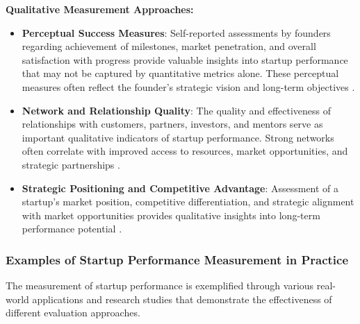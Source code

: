 \documentclass[../Main.tex]{subfiles}
\begin{document}
\textbf{Qualitative Measurement Approaches:}

\begin{itemize}
    \item \textbf{Perceptual Success Measures}: Self-reported assessments by founders regarding achievement of milestones, market penetration, and overall satisfaction with progress provide valuable insights into startup performance that may not be captured by quantitative metrics alone. These perceptual measures often reflect the founder's strategic vision and long-term objectives \cite{patton2014realising}.
    
    \item \textbf{Network and Relationship Quality}: The quality and effectiveness of relationships with customers, partners, investors, and mentors serve as important qualitative indicators of startup performance. Strong networks often correlate with improved access to resources, market opportunities, and strategic partnerships \cite{theodorakopoulos2014business}.
    
    \item \textbf{Strategic Positioning and Competitive Advantage}: Assessment of a startup's market position, competitive differentiation, and strategic alignment with market opportunities provides qualitative insights into long-term performance potential \cite{barney1991firm}.
\end{itemize}

\subsubsection*{Examples of Startup Performance Measurement in Practice}

The measurement of startup performance is exemplified through various real-world applications and research studies that demonstrate the effectiveness of different evaluation approaches.
\end{document}
